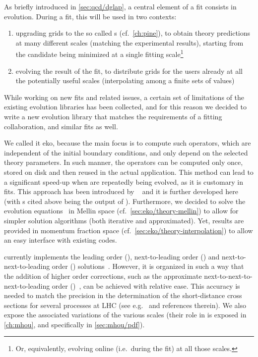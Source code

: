 
As briefly introduced in \cref{sec:qcd/dglap}, a central element of a \pdf fit
consists in \dglap evolution.
%
During a fit, this will be used in two contexts: 
\begin{enumerate}[label=\roman*.]
  \item upgrading grids to the so called \fktab{}s (cf.\ \cref{ch:pine}), to
    obtain theory predictions at many different scales (matching the
    experimental results), starting from the \pdf candidate being minimized at
    a single fitting scale\footnote{
      Or, equivalently, evolving online (i.e.\ during the fit) at all those scales.
    }
  \item evolving the result of the fit, to distribute \pdf grids for the users
    already at all the potentially useful scales (interpolating among a finite
    sets of values)
\end{enumerate}

While working on new \pdf fits and related issues, a certain set of limitations
of the existing \dglap evolution libraries has been collected, and for this
reason we decided to write a new \qcd{} evolution library that matches the
requirements of a \pdf fitting collaboration, and similar fits as well.

We called it \acrfull{eko}, because the main focus is to compute such
operators, which are independent of the initial boundary conditions, and only
depend on the selected theory parameters.
In such manner, the operators can be computed only once, stored on disk and
then reused in the actual application. This method can lead to a significant
speed-up when \pdfs are repeatedly being evolved, as it is customary in \pdf{}
fits.
This approach has been introduced by
\fk~\cite{Ball:2008by,Ball:2010de,DelDebbio:2007ee} and it is further developed
here (with \fktab{}s cited above being the output of \fk).
%
Furthermore, we decided to solve the evolution equations~ in Mellin space (cf.\
\cref{sec:eko/theory-mellin}) to allow for simpler solution algorithms (both
iterative and approximated).
Yet, results are provided in momentum fraction space (cf.\
\cref{sec:eko/theory-interpolation}) to allow an easy interface with existing
codes.

\eko{} currently implements the leading order (\lo{}),
next-to-leading order (\nlo{}) and next-to-next-to-leading order (\nnlo{})
solutions~\cite{Vogt:2004mw,Moch:2004pa,Blumlein:2021enk}.
However, it is organized in such a way that the addition of higher order
corrections, such as the approximate next-to-next-to-next-to-leading order
(\nnnlo{})~\cite{Moch:2021qrk}, can be achieved with relative ease.
This accuracy is needed to match the precision in the determination of the
short-distance cross sections for several processes at LHC (see e.g.\
\cite{Duhr:2021vwj} and references therein).
We also expose the associated variations of the various scales (their role in
\pdfs is exposed in \cref{ch:mhou}, and specifically in \cref{sec:mhou/pdf}).

